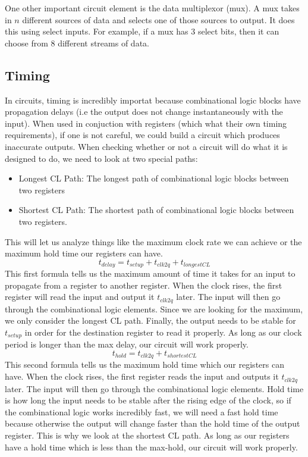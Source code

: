 \documentclass{article}
\begin{document}
One other important circuit element is the data multiplexor (mux). A mux takes in $n$ different sources of data and selects one of those
sources to output. It does this using select inputs. For example, if a mux has 3 select bits, then it can choose from 8 different streams of data.
\subsection{Timing}
In circuits, timing is incredibly importat because combinational logic blocks have propagation delays (i.e the output does not change instantaneously with the input).
When used in conjuction with registers (which what their own timing requirements), if one is not careful, we could build a circuit which produces inaccurate outputs.
When checking whether or not a circuit will do what it is designed to do, we need to look at two special paths:
\begin{itemize}
    \item Longest CL Path: The longest path of combinational logic blocks between two registers
    \item Shortest CL Path: The shortest path of combinational logic blocks between two registers.
\end{itemize}
This will let us analyze things like the maximum clock rate we can achieve or the maximum hold time our registers can have.
$$t_{delay} = t_{setup}+t_{clk2q}+t_{longestCL}$$
This first formula tells us the maximum amount of time it takes for an input to propagate from a register to another register.
When the clock rises, the first register will read the input and output it $t_{clk2q}$ later. The input will then go through the combinational logic
elements. Since we are looking for the maximum, we only consider the longest CL path. Finally, the output needs to be stable for $t_{setup}$ in order for the
destination register to read it properly. As long as our clock period is longer than the max delay, our circuit will work properly.
$$t_{hold}=t_{clk2q}+t_{shortestCL}$$
This second formula tells us the maximum hold time which our registers can have. When the clock rises, the first register reads the input and outputs it $t_{clk2q}$ later.
The input will then go through the combinational logic elements. Hold time is how long the input needs to be stable after the rising edge of the clock, so if the combinational
logic works incredibly fast, we will need a fast hold time because otherwise the output will change faster than the hold time of the output register. This is why we look at the
shortest CL path. As long as our registers have a hold time which is less than the max-hold, our circuit will work properly.
\end{document}
